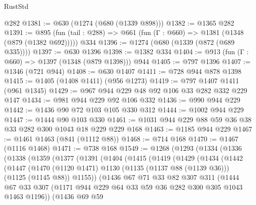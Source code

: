 \begin{lexlean}{RustStd}
\begin{coremodule}
{\begin{coremodule}
{{{{{{{{{{    @282
@1381 := @630 (@1274 (@680 (@1339 @898)))
@1382 := @1365 @282
@1391 := @895 (fun (tail : @288) => @661 (fun (Γ : @660) => @1381 (@1348 (@879 (@1382 @692))))) @334
@1396 := @1274 (@680 (@1339 (@872 (@689 @335))))
@1397 := @630 @1396
@1398 := @1382 @334
@1404 := @913 (fun (Γ : @660) => @1397 (@1348 (@879 @1398))) @944
@1405 := @797 @1396
@1407 := @1346 (@721 @944)
@1408 := @630 @1407
@1411 := @728 @944 @878 @1398
@1415 := @1405 (@1408 @1411) (@956 @1273)
@1419 := @797 @1407 @1411 (@961 @1345)
@1429 := @967 @944 @229 @48 @92 @106 @33 @282 @332 @229 @147
@1434 := @981 @944 @229 @92 @106 @332
@1436 := @990 @944 @229
@1442 := @1436 @90 @72 @103 @105 @330 @312
@1444 := @1002 @944 @229
@1447 := @1444 @90 @103 @330
@1461 := @1031 @944 @229 @88 @59 @36 @38 @33 @282 @300 @1043 @18 @229 @229 @168
@1463 := @1185 @944 @229
@1467 := @1461 @1463 (@841 (@1112 @88))
@1468 := @714 @168
@1470 := @1467 (@1116 @1468)
@1471 := @738 @168
@1549 := @1268
    (@1293
      (@1334
        (@1336
          (@1338
            (@1359
              (@1377
                (@1391
                  (@1404
                    (@1415
                      (@1419
                        (@1429
                          (@1434
                            (@1442
                              (@1447
                                (@1470
                                  (@1120 @1471)
                                  @1130
                                  (@1135 (@1137 @88 (@1139 @36)))
                                  (@1125 (@1145 @88))
                                  @1155))
                              (@1436
                                @67
                                @71
                                @33
                                @82
                                @307
                                @311
                                (@1444
                                  @67
                                  @33
                                  @307
                                  (@1171
                                    @944
                                    @229
                                    @64
                                    @33
                                    @59
                                    @36
                                    @282
                                    @300
                                    @305
                                    @1043
                                    @1463
                                    @1196))
                                (@1436
                                  @69
                                  @59
}}}}}}}}}}
\end{coremodule}}
\end{coremodule}
\end{lexlean}
